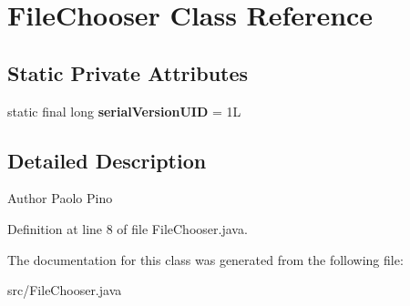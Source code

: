 \hypertarget{class_file_chooser}{\section{File\-Chooser Class Reference}
\label{class_file_chooser}
}
\subsection*{Static Private Attributes}
\begin{DoxyCompactItemize}
\item 
\hypertarget{class_file_chooser_a3cbd18488adfa238990fc2faf44a2931}{static final long {\bfseries serial\-Version\-U\-I\-D} = 1\-L}\label{class_file_chooser_a3cbd18488adfa238990fc2faf44a2931}

\end{DoxyCompactItemize}


\subsection{Detailed Description}
\begin{DoxyAuthor}{Author}
Paolo Pino 
\end{DoxyAuthor}


Definition at line 8 of file File\-Chooser.\-java.



The documentation for this class was generated from the following file\-:\begin{DoxyCompactItemize}
\item 
src/File\-Chooser.\-java\end{DoxyCompactItemize}
